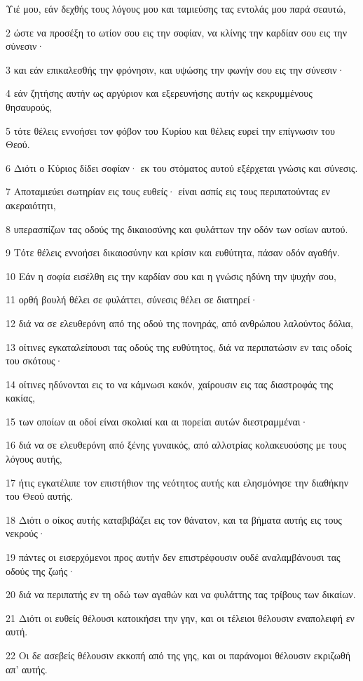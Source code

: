 \par Υιέ μου, εάν δεχθής τους λόγους μου και ταμιεύσης τας εντολάς μου παρά σεαυτώ,
\par 2 ώστε να προσέξη το ωτίον σου εις την σοφίαν, να κλίνης την καρδίαν σου εις την σύνεσιν·
\par 3 και εάν επικαλεσθής την φρόνησιν, και υψώσης την φωνήν σου εις την σύνεσιν·
\par 4 εάν ζητήσης αυτήν ως αργύριον και εξερευνήσης αυτήν ως κεκρυμμένους θησαυρούς,
\par 5 τότε θέλεις εννοήσει τον φόβον του Κυρίου και θέλεις ευρεί την επίγνωσιν του Θεού.
\par 6 Διότι ο Κύριος δίδει σοφίαν· εκ του στόματος αυτού εξέρχεται γνώσις και σύνεσις.
\par 7 Αποταμιεύει σωτηρίαν εις τους ευθείς· είναι ασπίς εις τους περιπατούντας εν ακεραιότητι,
\par 8 υπερασπίζων τας οδούς της δικαιοσύνης και φυλάττων την οδόν των οσίων αυτού.
\par 9 Τότε θέλεις εννοήσει δικαιοσύνην και κρίσιν και ευθύτητα, πάσαν οδόν αγαθήν.
\par 10 Εάν η σοφία εισέλθη εις την καρδίαν σου και η γνώσις ηδύνη την ψυχήν σου,
\par 11 ορθή βουλή θέλει σε φυλάττει, σύνεσις θέλει σε διατηρεί·
\par 12 διά να σε ελευθερόνη από της οδού της πονηράς, από ανθρώπου λαλούντος δόλια,
\par 13 οίτινες εγκαταλείπουσι τας οδούς της ευθύτητος, διά να περιπατώσιν εν ταις οδοίς του σκότους·
\par 14 οίτινες ηδύνονται εις το να κάμνωσι κακόν, χαίρουσιν εις τας διαστροφάς της κακίας,
\par 15 των οποίων αι οδοί είναι σκολιαί και αι πορείαι αυτών διεστραμμέναι·
\par 16 διά να σε ελευθερόνη από ξένης γυναικός, από αλλοτρίας κολακευούσης με τους λόγους αυτής,
\par 17 ήτις εγκατέλιπε τον επιστήθιον της νεότητος αυτής και ελησμόνησε την διαθήκην του Θεού αυτής.
\par 18 Διότι ο οίκος αυτής καταβιβάζει εις τον θάνατον, και τα βήματα αυτής εις τους νεκρούς·
\par 19 πάντες οι εισερχόμενοι προς αυτήν δεν επιστρέφουσιν ουδέ αναλαμβάνουσι τας οδούς της ζωής·
\par 20 διά να περιπατής εν τη οδώ των αγαθών και να φυλάττης τας τρίβους των δικαίων.
\par 21 Διότι οι ευθείς θέλουσι κατοικήσει την γην, και οι τέλειοι θέλουσιν εναπολειφή εν αυτή.
\par 22 Οι δε ασεβείς θέλουσιν εκκοπή από της γης, και οι παράνομοι θέλουσιν εκριζωθή απ' αυτής.

